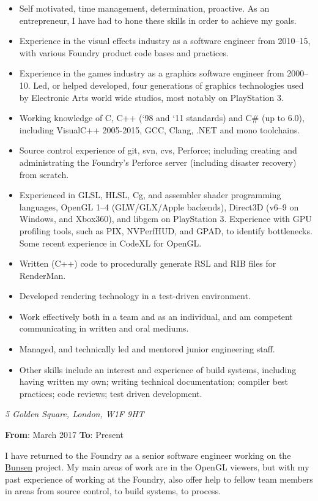 \documentclass[a4paper,12pt]{article}
\newcommand{\me}{Mark Final BSc (Hons) AMIMA}
\newcommand{\cvheading}[1]{{\medskip\noindent\hspace{-5mm}{\sc #1}\par}}
\newcommand{\place}[2]{\vspace*{1ex}{\noindent\bf #1}\hfill{\it #2}\par}
\newcommand{\fromto}[2]{{\bf From}: #1 {\bf To}: #2\par}
\begin{document}
\cvheading{Professional Skills}
\begin{itemize}
\item Self motivated, time management, determination, proactive. As an entrepreneur, I have had to hone these skills in order to achieve my goals.
\item Experience in the visual effects industry as a software engineer from 2010--15, with various Foundry product code bases and practices.
\item Experience in the games industry as a graphics software engineer from 2000--10. Led, or helped developed, four generations of graphics technologies used by Electronic Arts world wide studios, most notably on PlayStation 3.
\item Working knowledge of C, C++ (`98 and `11 standards) and C\# (up to 6.0), including VisualC++ 2005-2015, GCC, Clang, .NET and mono toolchains.
\item Source control experience of git, svn, cvs, Perforce; including creating and administrating the Foundry's Perforce server (including disaster recovery) from scratch.
\item Experienced in GLSL, HLSL, Cg, and assembler shader programming languages, OpenGL 1--4 (GLW/GLX/Apple backends), Direct3D (v6--9 on Windows, and Xbox360), and libgcm on PlayStation 3. Experience with GPU profiling tools, such as PIX, NVPerfHUD, and GPAD, to identify bottlenecks. Some recent experience in CodeXL for OpenGL.
\item Written (C++) code to procedurally generate RSL and RIB files for RenderMan.
\item Developed rendering technology in a test-driven environment.
\item Work effectively both in a team and as an individual, and am competent communicating in written and oral mediums.
\item Managed, and technically led and mentored junior engineering staff.
\item Other skills include an interest and experience of build systems, including having written my own; writing technical documentation; compiler best practices; code reviews; test driven development.
\end{itemize}

\pagebreak
\renewcommand{\thepage}{\tiny{\me\hfill\arabic{page}\hfill Curriculum Vitae}}

\cvheading{Work Experience}
\place{The Foundry VisionMongers Ltd}{5 Golden Square, London, W1F 9HT}
\fromto{March 2017}{Present}
I have returned to the Foundry as a senior software engineer working on the \href{https://www.foundry.com/events/siggraph-2016/project-bunsen}{Bunsen} project. My main areas of work are in the OpenGL viewers, but with my past experience of working at the Foundry, also offer help to fellow team members in areas from source control, to build systems, to process.
\end{document}
